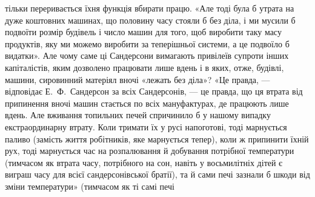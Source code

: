 \parcont{}  %
тільки переривається їхня функція вбирати працю. «Але тоді
була б утрата на дуже коштовних машинах, що половину часу
стояли б без діла, і ми мусили б подвоїти розмір будівель і число
машин для того, щоб виробити таку масу продуктів, яку ми можемо
виробити за теперішньої системи, а це подвоїло б видатки». Але
чому саме ці Сандерсони вимагають привілеїв супроти інших
капіталістів, яким дозволено працювати лише вдень і в яких,
отже, будівлі, машини, сировинний матеріял вночі «лежать без
діла»? «Це правда, — відповідає Е.~Ф.~Сандерсон за всіх Сандерсонів,
— це правда, що ця втрата від припинення вночі машин
стається по всіх мануфактурах, де працюють лише вдень. Але
вживання топильних печей спричинило б у нашому випадку
екстраординарну втрату. Коли тримати їх у русі напоготові, тоді
марнується паливо (замість життя робітників, яке марнується тепер),
коли ж припинити їхній рух, тоді марнується час на розпалювання
й добування потрібної температури (тимчасом як втрата
часу, потрібного на сон, навіть у восьмилітніх дітей є виграш
часу для всієї сандерсонівської братії), та й сами печі зазнали
б шкоди від зміни температури» (тимчасом як ті самі печі
